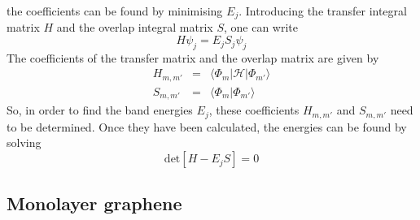 the coefficients can be found by minimising $E_j$. Introducing the transfer integral matrix $H$ and the overlap integral matrix $S$, one can write
\begin{equation}
H \psi_j =  E_j S_j \psi_j
\end{equation}
The coefficients of the transfer matrix and the overlap matrix are given by
\begin{eqnarray}
H_{m, m'} &=& \langle \Phi_m | \mathcal{H} | \Phi_{m'} \rangle \\
S_{m, m'} &=& \langle \Phi_m | \Phi_{m'}\rangle
\end{eqnarray}
So, in order to find the band energies $E_j$, these coefficients $H_{m, m'}$ and $S_{m, m'}$ need to be determined. Once they have been calculated, the energies can be found by solving
\begin{equation}
\text{det} \left[ H - E_j S \right] = 0
\end{equation}

\subsection{Monolayer graphene}

